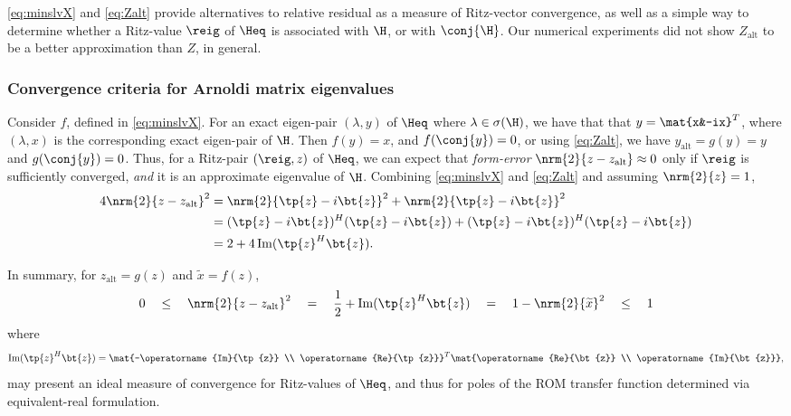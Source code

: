 \eqref{eq:minslvX} and \eqref{eq:Zalt} provide alternatives
to relative residual as a measure of Ritz-vector convergence, as well as a simple
way to determine whether a Ritz-value $\reig$ of $\Heq$ is associated with $\H$,
or with $\conj{\H}$. Our numerical experiments did not show $Z_{\text{alt}}$ to be a
better approximation than $Z$, in general.



\subsubsection{Convergence criteria for Arnoldi matrix eigenvalues}
Consider $f$, defined
in \eqref{eq:minslvX}.  For an exact eigen-pair $(\lambda, y)$ of $\Heq$
where $\lambda\in\sigma(\H)$, we have that
that $y=\mat{x&-ix}^T$, where $(\lambda,x)$ is the corresponding
exact eigen-pair of $\H$.
Then $f(y) = x$, and $f(\conj{y})=0$, or using \eqref{eq:Zalt}, we have $y_\text{alt}=g(y)=y$
and $g(\conj{y})=0$.
Thus, for a Ritz-pair $(\reig,z)$ of $\Heq$, we can expect that
\emph{form-error} $\nrm{2}{z-z_{\text{alt}}}\approx 0$
 only if $\reig$ is sufficiently converged, \emph{and} it is
an approximate eigenvalue of $\H$. Combining \eqref{eq:minslvX} and \eqref{eq:Zalt}
and assuming $\nrm{2}{z}=1$,
\begin{align*}
4\nrm{2}{z-z_\text{alt}}^2 &= \nrm{2}{\tp{z}-i\bt{z}}^2 + \nrm{2}{\tp{z}-i\bt{z}}^2 \\
&= (\tp{z}-i\bt{z})^H(\tp{z}-i\bt{z}) +(\tp{z}-i\bt{z})^H(\tp{z}-i\bt{z})\\
&= 2+4\operatorname{Im}(\tp{z}^H\bt{z}).
\end{align*}

 In summary, for $z_\text{alt}=g(z)$ and $\widetilde{x}=f(z)$,
 \begin{equation}
 0\quad\leq\quad \nrm{2}{z-z_\text{alt}}^2 		 \quad=\quad
 \frac{1}{2}+ \operatorname{Im}(\tp{z}^H\bt{z})  \quad=\quad
 1 - \nrm{2}{\widetilde{x}}^2 \quad\leq\quad 1
 \label{eq:formerr}
 \end{equation}
where
\[
\operatorname{Im}(\tp{z}^H\bt{z})=
\mat{-\operatorname{Im}{\tp{z}} \\ \operatorname{Re}{\tp{z}}}^T \mat{\operatorname{Re}{\bt{z}} \\ \operatorname{Im}{\bt{z}}},
\]
may present an ideal measure of convergence for Ritz-values of $\Heq$, and thus for poles of
the ROM transfer function determined via equivalent-real formulation.

